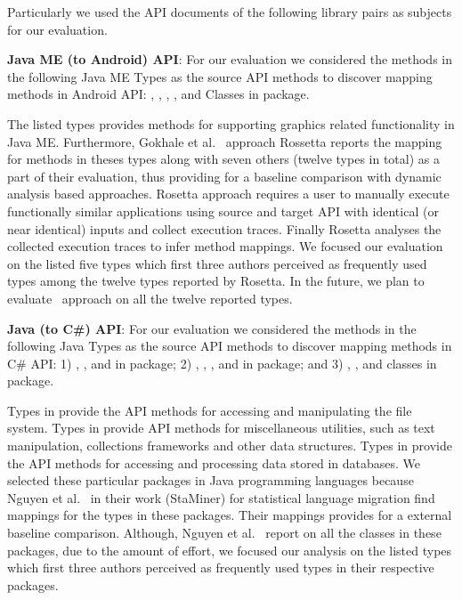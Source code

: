Particularly we used the API documents of the following library pairs as subjects for our evaluation. 


\textbf{Java ME (to Android) API}:
For our evaluation we considered the methods in the following Java ME Types as the source API methods to discover mapping methods in Android API: 
,
,
,
, and
Classes in    package.


The listed types provides methods for supporting graphics related functionality in Java ME.
Furthermore, Gokhale et al.~\cite{Gokhale2013ICSE} approach Rossetta reports the
mapping for methods in theses types along with seven others (twelve types in total) as a part of their evaluation,
thus providing for a baseline comparison with dynamic analysis based approaches.
Rosetta approach requires a user to manually execute functionally similar applications using source and target API with identical (or near identical) inputs and collect execution traces.
Finally Rosetta analyses the collected execution traces to infer method mappings.
We focused our evaluation on the listed five types which first three authors perceived as frequently used types among the twelve types reported by Rosetta.
In the future, we plan to evaluate \tool\ approach on all the twelve reported types. 

\textbf{Java (to C\#) API}:
For our evaluation we considered the methods in the following Java Types as the source API methods to discover mapping methods in C\# API: 
1) ,
, and 
 in  package;
2) ,
,
, and 
 in  package; and
3) ,
, and 
 classes in  package.
 
Types in  provide the API methods for accessing and manipulating the file system.
Types in  provide API methods for miscellaneous utilities, such as text manipulation, collections frameworks and other data structures.
Types in  provide the API methods for accessing and processing data stored in databases.
We selected these particular packages in Java programming languages because Nguyen et al.~\cite{nguyen2014statistical} in their work (StaMiner) for statistical language migration find mappings for the types in these packages.
Their mappings provides for a external baseline comparison.
Although, Nguyen et al.~\cite{nguyen2014statistical} report on all the classes in these packages,
due to the amount of effort, we focused our analysis on the listed types which first three authors perceived as frequently used types in their respective packages.


